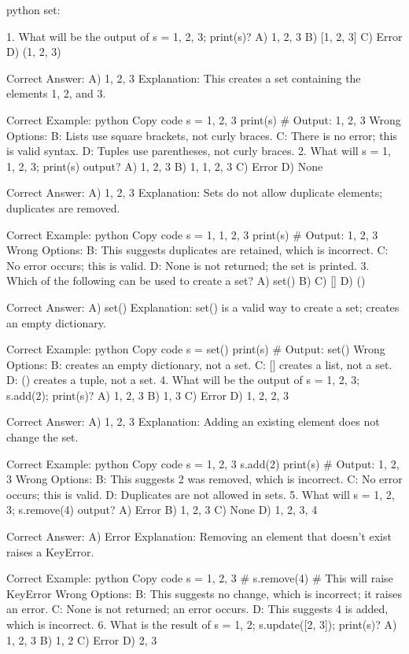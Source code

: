 python set:

1. What will be the output of s = {1, 2, 3}; print(s)?
A) {1, 2, 3}
B) [1, 2, 3]
C) Error
D) (1, 2, 3)

Correct Answer: A) {1, 2, 3}
Explanation: This creates a set containing the elements 1, 2, and 3.

Correct Example:
python
Copy code
s = {1, 2, 3}
print(s)  # Output: {1, 2, 3}
Wrong Options:
B: Lists use square brackets, not curly braces.
C: There is no error; this is valid syntax.
D: Tuples use parentheses, not curly braces.
2. What will s = {1, 1, 2, 3}; print(s) output?
A) {1, 2, 3}
B) {1, 1, 2, 3}
C) Error
D) None

Correct Answer: A) {1, 2, 3}
Explanation: Sets do not allow duplicate elements; duplicates are removed.

Correct Example:
python
Copy code
s = {1, 1, 2, 3}
print(s)  # Output: {1, 2, 3}
Wrong Options:
B: This suggests duplicates are retained, which is incorrect.
C: No error occurs; this is valid.
D: None is not returned; the set is printed.
3. Which of the following can be used to create a set?
A) set()
B) {}
C) []
D) ()

Correct Answer: A) set()
Explanation: set() is a valid way to create a set; {} creates an empty dictionary.

Correct Example:
python
Copy code
s = set()
print(s)  # Output: set()
Wrong Options:
B: {} creates an empty dictionary, not a set.
C: [] creates a list, not a set.
D: () creates a tuple, not a set.
4. What will be the output of s = {1, 2, 3}; s.add(2); print(s)?
A) {1, 2, 3}
B) {1, 3}
C) Error
D) {1, 2, 2, 3}

Correct Answer: A) {1, 2, 3}
Explanation: Adding an existing element does not change the set.

Correct Example:
python
Copy code
s = {1, 2, 3}
s.add(2)
print(s)  # Output: {1, 2, 3}
Wrong Options:
B: This suggests 2 was removed, which is incorrect.
C: No error occurs; this is valid.
D: Duplicates are not allowed in sets.
5. What will s = {1, 2, 3}; s.remove(4) output?
A) Error
B) {1, 2, 3}
C) None
D) {1, 2, 3, 4}

Correct Answer: A) Error
Explanation: Removing an element that doesn't exist raises a KeyError.

Correct Example:
python
Copy code
s = {1, 2, 3}
# s.remove(4)  # This will raise KeyError
Wrong Options:
B: This suggests no change, which is incorrect; it raises an error.
C: None is not returned; an error occurs.
D: This suggests 4 is added, which is incorrect.
6. What is the result of s = {1, 2}; s.update([2, 3]); print(s)?
A) {1, 2, 3}
B) {1, 2}
C) Error
D) {2, 3}

